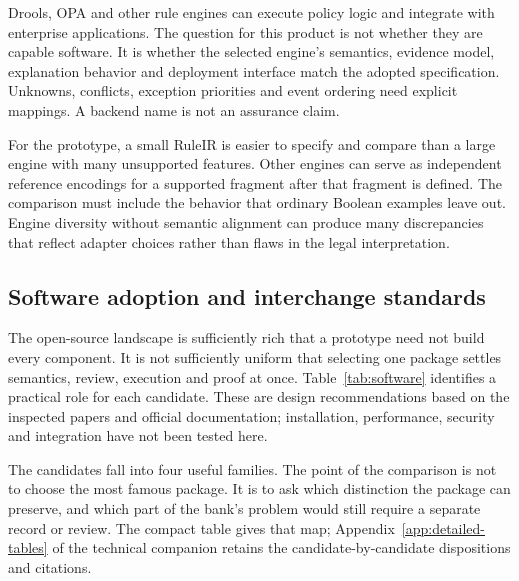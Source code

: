 
Drools, OPA and other rule engines can execute policy logic and integrate with
enterprise applications. The question for this product is not whether they
are capable software. It is whether the selected engine's semantics, evidence
model, explanation behavior and deployment interface match the adopted
specification. Unknowns, conflicts, exception priorities and event ordering
need explicit mappings. A backend name is not an assurance claim.

For the prototype, a small RuleIR is easier to specify and compare than a
large engine with many unsupported features. Other engines can serve as
independent reference encodings for a supported fragment after that fragment
is defined. The comparison must include the behavior that ordinary Boolean
examples leave out. Engine diversity without semantic alignment can produce
many discrepancies that reflect adapter choices rather than flaws in the
legal interpretation.

\subsection{Software adoption and interchange standards}
\label{merge:P-02-literature:08}


The open-source landscape is sufficiently rich that a prototype need not build
every component. It is not sufficiently uniform that selecting one package
settles semantics, review, execution and proof at once. Table~\ref{tab:software}
identifies a practical role for each candidate. These are design recommendations
based on the inspected papers and official documentation; installation,
performance, security and integration have not been tested here.

The candidates fall into four useful families. The point of the comparison is
not to choose the most famous package. It is to ask which distinction the package
can preserve, and which part of the bank's problem would still require a separate
record or review. The compact table gives that map; Appendix~\ref{app:detailed-tables} of the technical companion
retains the candidate-by-candidate dispositions and citations.

